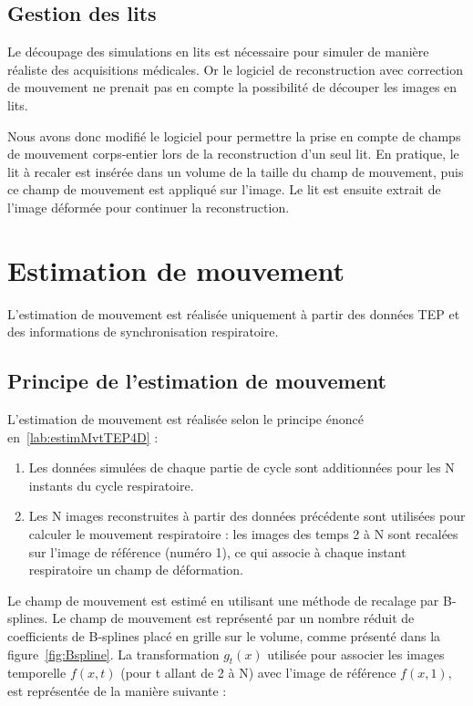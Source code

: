 \subsection{Gestion des lits}

Le découpage des simulations en lits est nécessaire pour simuler de manière réaliste des acquisitions médicales. Or le logiciel de reconstruction avec correction de mouvement ne prenait pas en compte la possibilité de découper les images en lits.

Nous avons donc modifié le logiciel pour permettre la prise en compte de champs de mouvement corps-entier lors de la reconstruction d'un seul lit. En pratique, le lit à recaler est insérée dans un volume de la taille du champ de mouvement, puis ce champ de mouvement est appliqué sur l'image. Le lit est ensuite extrait de l'image déformée pour continuer la reconstruction.


\section{Estimation de mouvement}

L'estimation de mouvement est réalisée uniquement à partir des données TEP et des informations de synchronisation respiratoire. 

\subsection{Principe de l'estimation de mouvement}

L'estimation de mouvement est réalisée selon le principe énoncé en~\ref{lab:estimMvtTEP4D} :
\begin{enumerate}
 \item Les données simulées de chaque partie de cycle sont additionnées pour les N instants du cycle respiratoire.
 \item Les N images reconstruites à partir des données précédente sont utilisées pour calculer le mouvement respiratoire : les images des temps 2 à N sont recalées sur l'image de référence (numéro 1), ce qui associe à chaque instant respiratoire un champ de déformation.
\end{enumerate}


Le champ de mouvement est estimé en utilisant une méthode de recalage par B-splines. Le champ de mouvement est représenté par un nombre réduit de coefficients de B-splines placé en grille sur le volume, comme présenté dans la figure~\ref{fig:Bspline}. La transformation $g_t(x)$ utilisée pour associer les images temporelle  $f(x,t)$ (pour t allant de 2 à N) avec l'image de référence $f(x,1)$, est représentée de la manière suivante :

